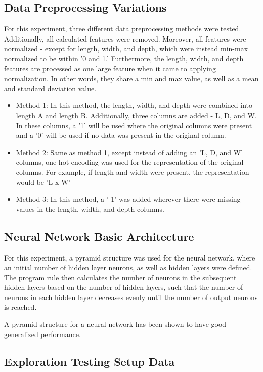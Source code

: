 \documentclass[conference]{IEEEtran}
\begin{document}
\subsection{Data Preprocessing Variations}

For this experiment, three different data preprocessing methods were tested. Additionally, all calculated features were removed. Moreover, all features were normalized - except for length, width, and depth, which were instead min-max normalized to be within '0 and 1.' Furthermore, the length, width, and depth features are processed as one large feature when it came to applying normalization. In other words, they share a min and max value, as well as a mean and standard deviation value.

\begin{itemize}
    \item Method 1: In this method, the length, width, and depth were combined into length A and length B. Additionally, three columns are added - L, D, and W. In these columns, a '1' will be used where the original columns were present and a '0' will be used if no data was present in the original column. 
    \item Method 2: Same as method 1, except instead of adding an 'L, D, and W' columns, one-hot encoding was used for the representation of the original columns. For example, if length and width were present, the representation would be 'L x W'
    \item Method 3: In this method, a '-1' was added wherever there were missing values in the length, width, and depth columns. 
\end{itemize}

\subsection{Neural Network Basic Architecture}

For this experiment, a pyramid structure was used for the neural network, where an initial number of hidden layer neurons, as well as hidden layers were defined. The program rule then calculates the number of neurons in the subsequent hidden layers based on the number of hidden layers, such that the number of neurons in each hidden layer decreases evenly until the number of output neurons is reached. 

A pyramid structure for a neural network has been shown to have good generalized performance. \cite{b1}

\subsection{Exploration Testing Setup Data}
\end{document}
